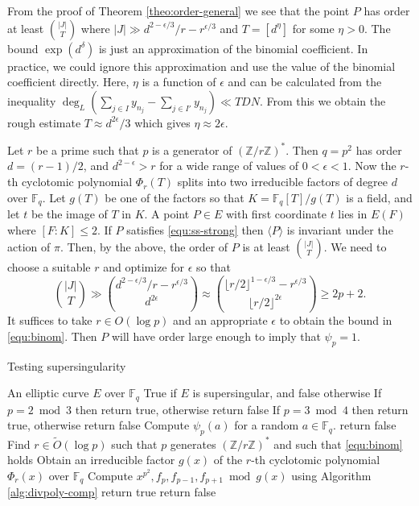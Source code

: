 \documentclass[11pt]{article}
\theoremstyle{plain}
\theoremstyle{definition}
\newcommand{\ang}[1]{\langle#1\rangle}
\newcommand{\abs}[1]{\left\vert#1\right\vert}
\newcommand{\tildO}{\tilde{O}}
\def\Z{\ensuremath{\mathbb{Z}}}
\def\F{\ensuremath{\mathbb{F}}}
\begin{document}
From the proof of Theorem \ref{theo:order-general} we see that the point $P$ has order at least 
$\binom{\abs{J}}{T}$ where $\abs{J} \gg d^{2 - \epsilon / 3} / r - r^{\epsilon / 3}$ and $T = 
[d^\eta]$ for some $\eta > 0$. The bound $\exp(d^\delta)$ is just an approximation of the binomial 
coefficient. In practice, we could ignore this approximation and use the value of the binomial 
coefficient directly. Here, $\eta$ is a function of $\epsilon$ and can be calculated from the 
inequality $\deg_L(\sum_{j \in I}y_{n_j} - \sum_{j \in I'}y_{n_j}) \ll TDN $. From this we obtain 
the rough estimate $T \approx d^{2\epsilon} / 3$ which gives $\eta \approx 2\epsilon$. 

Let $r$ be a prime such that $p$ is a generator of $(\Z/r\Z)^*$. Then $q = p^2$ has order $d = (r - 
1) / 2$, and $d^{2 - \epsilon} > r$ for a wide range of values of $0 < \epsilon < 1$. Now the 
$r$-th cyclotomic polynomial $\Phi_r(T)$ splits into two irreducible factors of degree $d$ over 
$\F_q$. Let $g(T)$ be one of the factors so that $K = \F_q[T]/g(T)$ is a field, and let $t$ be the 
image of $T$ in $K$. A point $P \in E$ with first coordinate $t$ lies in $E(F)$ where $[F : K] \le 
2$. If $P$ satisfies \eqref{equ:ss-strong} then $\ang{P}$ is invariant under the action of $\pi$. 
Then, by the above, the order of $P$ is at least $\binom{\abs{J}}{T}$. We need to choose a suitable 
$r$ and optimize for $\epsilon$ so that
\begin{equation}
	\label{equ:binom}
	\binom{\abs{J}}{T} \gg \binom{d^{2 - \epsilon / 3} / r - r^{\epsilon / 3}}{d^{2\epsilon}} 
	\approx \binom{\lfloor r / 2 \rfloor^{1 - \epsilon / 3} - r^{\epsilon / 3}}{\lfloor r / 2 
	\rfloor^{2\epsilon}} \ge 2p + 2.
\end{equation}
It suffices to take $r \in O(\log p)$ and an appropriate $\epsilon$ to obtain the bound in 
\eqref{equ:binom}. Then $P$ will have order large enough to imply that $\psi_p = 1$. 

\begin{algorithm}[H]
	\caption{Testing supersingularity}
	\label{alg:ss-strong}
	\begin{algorithmic}[1]
		\Require An elliptic curve $E$ over $\F_q$
		\Ensure True if $E$ is supersingular, and false otherwise
			\State If $p = 2 \bmod 3$ then return true, otherwise return false
		\EndIf
			\State If $p = 3 \bmod 4$ then return true, otherwise return false
		\EndIf
		\State\label{step:ss-eval}%
		Compute $\psi_p(a)$ for a random $a \in \F_q$.
			\State return false
		\EndIf
		\State\label{step:ss-find-par}%
		Find $r \in \tildO(\log p)$ such that $p$ generates $(\Z/r\Z)^*$ and such that 
		\eqref{equ:binom} holds
		\State\label{step:cyclo}%
		Obtain an irreducible factor $g(x)$ of the $r$-th cyclotomic polynomial $\Phi_r(x)$ over 
		$\F_q$
		\State\label{step:ss-psi}%
		Compute $x^{p^2}, f_p, f_{p - 1}, f_{p + 1} \bmod g(x)$ using Algorithm 
		\ref{alg:divpoly-comp}
			\State return true
		\Else
			\State return false
		\EndIf
	\end{algorithmic}
\end{algorithm}
\end{document}
